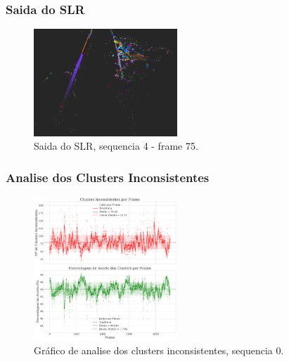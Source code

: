 \documentclass[aspectratio=169,t,xcolor=table]{beamer}
\begin{document}
\begin{frame}
    \frametitle{Saida do SLR}
    \begin{figure}
        \centering
        \includegraphics[width=0.48\textwidth]{figs/slr_2_s4f75.png}
        \caption {Saida do SLR, sequencia 4 - frame 75.}
    \end{figure}
\end{frame}

\begin{frame}
    \frametitle{Analise dos Clusters Inconsistentes}
    \begin{figure}
        \centering
        \includegraphics[width=0.48\textwidth]{figs/plot-3.png}
        \caption {Gráfico de analise dos clusters inconsistentes, sequencia 0.}
    \end{figure}
\end{frame}
\end{document}
